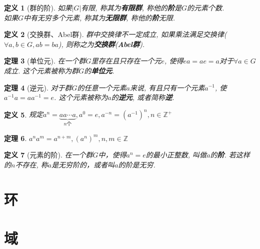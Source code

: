 \documentclass[UTF8]{ctexart}
\newtheorem{Definition}{定义}%
\newtheorem{Theorem}[Definition]{定理}
\begin{document}
\begin{Definition}[群的阶]
如果$|G|$有限, 称其为\textbf{有限群}, 称他的\textbf{阶}是$G$的元素个数. \\
如果$G$中有无穷多个元素, 称其为\textbf{无限群}, 称他的\textbf{阶}无限.
\end{Definition}

\begin{Definition}[交换群、Abel群]
群中交换律不一定成立, 如果乘法满足交换律($\forall a, b \in G, ab = ba$), 则称之为\textbf{交换群}(\textbf{Abel群}).
\end{Definition}

\begin{Theorem}[单位元]
在一个群$G$里存在且只存在一个元$e$, 使得$ea = ae = a$对于$\forall a \in G$成立. 这个元素被称为群$G$的\textbf{单位元}.
\end{Theorem}

\begin{Theorem}[逆元]
对于群$G$的任意一个元素$a$来说, 有且只有一个元素$a^{-1}$, 
使 $a^{-1} a = a a^{-1} = e$. 这个元素被称为$a$的\textbf{逆元}, 或者简称\textbf{逆}.
\end{Theorem}

\begin{Definition}
规定$a^n = \underbrace{a a \cdots a}_{n\text{个}}, a^0 = e, a^{-n} = (a^{-1})^n, n \in \mathbb{Z}^{+}$
\end{Definition}

\begin{Theorem}
$ a^n a^m = a^{n+m}, (a^n)^m, n, m \in \mathbb{Z} $
\end{Theorem}

\begin{Definition}[元素的阶]
在一个群$G$中，使得$a^n = e$的最小正整数, 叫做$a$的\textbf{阶}. 若这样的$n$不存在, 称$a$是无穷阶的，或者叫$a$的阶是无穷.
\end{Definition}

\section{环}
\section{域}
\end{document}
